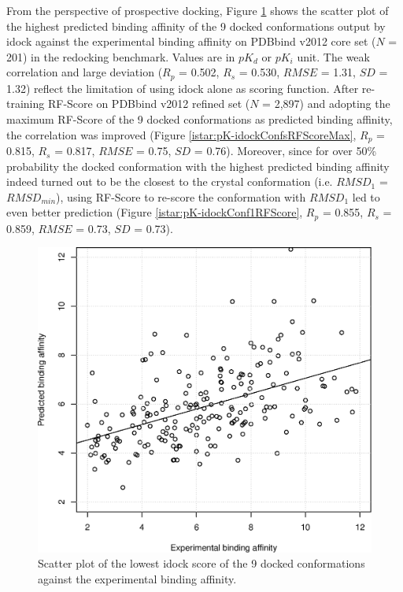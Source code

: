 From the perspective of prospective docking, Figure \ref{istar:pK-idockConf1idock} shows the scatter plot of the highest predicted binding affinity of the 9 docked conformations output by idock against the experimental binding affinity on PDBbind v2012 core set ($N$ = 201) in the redocking benchmark. Values are in $pK_d$ or $pK_i$ unit. The weak correlation and large deviation ($R_p$ = 0.502, $R_s$ = 0.530, $RMSE$ = 1.31, $SD$ = 1.32) reflect the limitation of using idock alone as scoring function. After re-training RF-Score on PDBbind v2012 refined set ($N$ = 2,897) and adopting the maximum RF-Score of the 9 docked conformations as predicted binding affinity, the correlation was improved (Figure \ref{istar:pK-idockConfsRFScoreMax}, $R_p$ = 0.815, $R_s$ = 0.817, $RMSE$ = 0.75, $SD$ = 0.76). Moreover, since for over 50\% probability the docked conformation with the highest predicted binding affinity indeed turned out to be the closest to the crystal conformation (i.e. $RMSD_1$ = $RMSD_{min}$), using RF-Score to re-score the conformation with $RMSD_1$ led to even better prediction (Figure \ref{istar:pK-idockConf1RFScore}, $R_p$ = 0.855, $R_s$ = 0.859, $RMSE$ = 0.73, $SD$ = 0.73).

\begin{figure}
\begin{center}
\includegraphics[width=\linewidth]{../istar/pK-idockConf1idock.eps}
\end{center}
\caption{Scatter plot of the lowest idock score of the 9 docked conformations against the experimental binding affinity.}
\label{istar:pK-idockConf1idock}
\end{figure}

